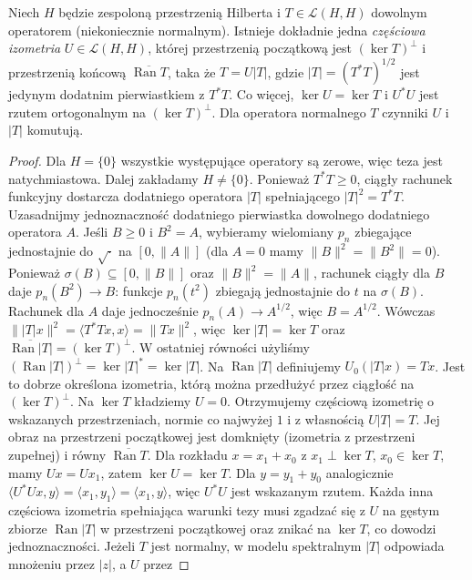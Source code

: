\begin{twierdzenie}
\label{thm:polar-decomp32}
Niech $H$ będzie zespoloną przestrzenią Hilberta i
$T\in\mathcal L(H,H)$ dowolnym operatorem (niekoniecznie normalnym).
Istnieje dokładnie jedna \emph{częściowa izometria}
$U\in\mathcal L(H,H)$, której przestrzenią początkową jest
$(\ker T)^\perp$ i przestrzenią końcową
$\overline{\operatorname{Ran}T}$, taka że
$T=U|T|$, gdzie $|T|=(T^*T)^{1/2}$ jest jedynym dodatnim
pierwiastkiem z $T^*T$. Co więcej, $\ker U=\ker T$
i $U^*U$ jest rzutem ortogonalnym na $(\ker T)^\perp$.
Dla operatora normalnego $T$ czynniki $U$ i $|T|$ komutują.
\end{twierdzenie}
\begin{proof}
Dla $H=\{0\}$ wszystkie występujące operatory są zerowe,
więc teza jest natychmiastowa. Dalej zakładamy $H\ne\{0\}$.
Ponieważ $T^*T\ge0$, ciągły rachunek funkcyjny
dostarcza dodatniego operatora $|T|$ spełniającego
$|T|^2=T^*T$. Uzasadnijmy jednoznaczność dodatniego
pierwiastka dowolnego dodatniego operatora $A$.
Jeśli $B\ge0$ i $B^2=A$, wybieramy wielomiany $p_n$
zbiegające jednostajnie do $\sqrt{\cdot}$ na
$[0,\|A\|]$ (dla $A=0$ mamy $\|B\|^2=\|B^2\|=0$).
Ponieważ $\sigma(B)\subseteq[0,\|B\|]$ oraz
$\|B\|^2=\|A\|$, rachunek ciągły dla $B$ daje
$p_n(B^2)\to B$: funkcje $p_n(t^2)$ zbiegają
jednostajnie do $t$ na $\sigma(B)$.
Rachunek dla $A$ daje jednocześnie $p_n(A)\to A^{1/2}$,
więc $B=A^{1/2}$. Wówczas
$\||T|x\|^2=\langle T^*Tx,x\rangle=\|Tx\|^2$, więc
$\ker|T|=\ker T$ oraz
$\overline{\operatorname{Ran}|T|}=(\ker T)^\perp$.
W ostatniej równości użyliśmy
$(\operatorname{Ran}|T|)^\perp=\ker|T|^*=\ker|T|$.
Na $\operatorname{Ran}|T|$ definiujemy $U_0(|T|x)=Tx$.
Jest to dobrze określona izometria, którą można przedłużyć
przez ciągłość na $(\ker T)^\perp$.
Na $\ker T$ kładziemy $U=0$. Otrzymujemy częściową
izometrię o wskazanych przestrzeniach, normie co najwyżej $1$
i z własnością $U|T|=T$. Jej obraz na przestrzeni
początkowej jest domknięty (izometria z przestrzeni
zupełnej) i równy $\overline{\operatorname{Ran}T}$.
Dla rozkładu $x=x_1+x_0$ z $x_1\perp\ker T$,
$x_0\in\ker T$, mamy $Ux=Ux_1$, zatem $\ker U=\ker T$.
Dla $y=y_1+y_0$ analogicznie
$\langle U^*Ux,y\rangle=\langle x_1,y_1\rangle
=\langle x_1,y\rangle$, więc $U^*U$ jest wskazanym rzutem.
Każda inna częściowa izometria spełniająca warunki tezy
musi zgadzać się z $U$ na gęstym zbiorze
$\operatorname{Ran}|T|$ w przestrzeni początkowej oraz znikać
na $\ker T$, co dowodzi jednoznaczności.
Jeżeli $T$ jest normalny, w modelu spektralnym
$|T|$ odpowiada mnożeniu przez $|z|$, a $U$ przez

\end{proof}
